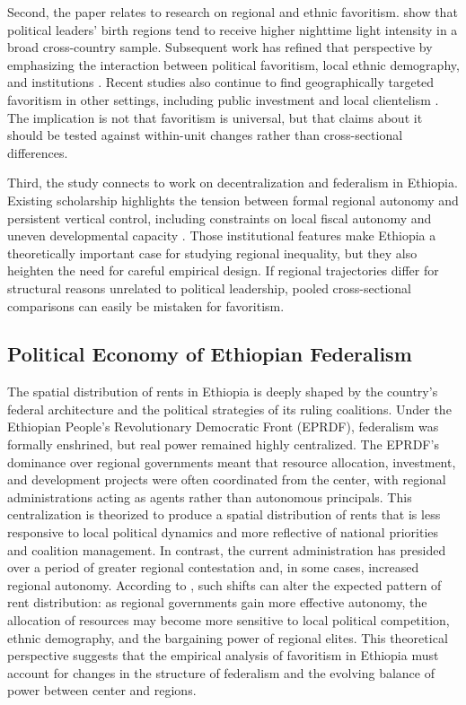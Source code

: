 \documentclass[12pt,a4paper]{article}
\begin{document}
Second, the paper relates to research on regional and ethnic favoritism. \citet{Hodler2014} show that political leaders' birth regions tend to receive higher nighttime light intensity in a broad cross-country sample. Subsequent work has refined that perspective by emphasizing the interaction between political favoritism, local ethnic demography, and institutions \citep{BeiserMcGrath2021}. Recent studies also continue to find geographically targeted favoritism in other settings, including public investment and local clientelism \citep{Onana2024,Cruzatti2024, GoldenMin2013}. The implication is not that favoritism is universal, but that claims about it should be tested against within-unit changes rather than cross-sectional differences.

Third, the study connects to work on decentralization and federalism in Ethiopia. Existing scholarship highlights the tension between formal regional autonomy and persistent vertical control, including constraints on local fiscal autonomy and uneven developmental capacity \citep{Faguet2021,Wubneh2017}. Those institutional features make Ethiopia a theoretically important case for studying regional inequality, but they also heighten the need for careful empirical design. If regional trajectories differ for structural reasons unrelated to political leadership, pooled cross-sectional comparisons can easily be mistaken for favoritism.

\subsection*{Political Economy of Ethiopian Federalism}
The spatial distribution of rents in Ethiopia is deeply shaped by the country’s federal architecture and the political strategies of its ruling coalitions. Under the Ethiopian People’s Revolutionary Democratic Front (EPRDF), federalism was formally enshrined, but real power remained highly centralized. The EPRDF’s dominance over regional governments meant that resource allocation, investment, and development projects were often coordinated from the center, with regional administrations acting as agents rather than autonomous principals. This centralization is theorized to produce a spatial distribution of rents that is less responsive to local political dynamics and more reflective of national priorities and coalition management. In contrast, the current administration has presided over a period of greater regional contestation and, in some cases, increased regional autonomy. According to \citet{Faguet2021}, such shifts can alter the expected pattern of rent distribution: as regional governments gain more effective autonomy, the allocation of resources may become more sensitive to local political competition, ethnic demography, and the bargaining power of regional elites. This theoretical perspective suggests that the empirical analysis of favoritism in Ethiopia must account for changes in the structure of federalism and the evolving balance of power between center and regions.
\end{document}
